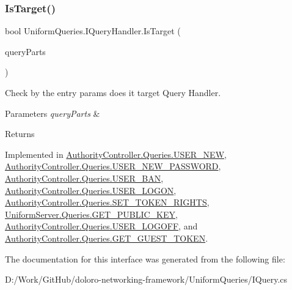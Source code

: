 \mbox{\label{interface_uniform_queries_1_1_i_query_handler_abda1ccf47ad2889fbd015955965046e7}} 
\subsubsection{\texorpdfstring{Is\+Target()}{IsTarget()}}
{\footnotesize\ttfamily bool Uniform\+Queries.\+I\+Query\+Handler.\+Is\+Target (\begin{DoxyParamCaption}\item[{\mbox{\hyperlink{struct_uniform_queries_1_1_query_part}{Query\+Part}} \mbox{[}$\,$\mbox{]}}]{query\+Parts }\end{DoxyParamCaption})}



Check by the entry params does it target Query Handler. 


\begin{DoxyParams}{Parameters}
{\em query\+Parts} & \\
\hline
\end{DoxyParams}
\begin{DoxyReturn}{Returns}

\end{DoxyReturn}


Implemented in \mbox{\hyperlink{class_authority_controller_1_1_queries_1_1_u_s_e_r___n_e_w_a6e26596b5a5ecc3d07591766b5d325ec}{Authority\+Controller.\+Queries.\+U\+S\+E\+R\+\_\+\+N\+EW}}, \mbox{\hyperlink{class_authority_controller_1_1_queries_1_1_u_s_e_r___n_e_w___p_a_s_s_w_o_r_d_a48ff6874453caf45973ad386bfe5b513}{Authority\+Controller.\+Queries.\+U\+S\+E\+R\+\_\+\+N\+E\+W\+\_\+\+P\+A\+S\+S\+W\+O\+RD}}, \mbox{\hyperlink{class_authority_controller_1_1_queries_1_1_u_s_e_r___b_a_n_a29c898b411adc3a0edbed31cf90e007b}{Authority\+Controller.\+Queries.\+U\+S\+E\+R\+\_\+\+B\+AN}}, \mbox{\hyperlink{class_authority_controller_1_1_queries_1_1_u_s_e_r___l_o_g_o_n_a53261c6c60dc1a2324a67adf19f7547a}{Authority\+Controller.\+Queries.\+U\+S\+E\+R\+\_\+\+L\+O\+G\+ON}}, \mbox{\hyperlink{class_authority_controller_1_1_queries_1_1_s_e_t___t_o_k_e_n___r_i_g_h_t_s_a605feed66d357dc93ccc825068d83c96}{Authority\+Controller.\+Queries.\+S\+E\+T\+\_\+\+T\+O\+K\+E\+N\+\_\+\+R\+I\+G\+H\+TS}}, \mbox{\hyperlink{class_uniform_server_1_1_queries_1_1_g_e_t___p_u_b_l_i_c___k_e_y_ae27d462fe9ccbbf22ac03c9ead9cbe8f}{Uniform\+Server.\+Queries.\+G\+E\+T\+\_\+\+P\+U\+B\+L\+I\+C\+\_\+\+K\+EY}}, \mbox{\hyperlink{class_authority_controller_1_1_queries_1_1_u_s_e_r___l_o_g_o_f_f_afbfa78117d68ab2bd2728c78d31c1c58}{Authority\+Controller.\+Queries.\+U\+S\+E\+R\+\_\+\+L\+O\+G\+O\+FF}}, and \mbox{\hyperlink{class_authority_controller_1_1_queries_1_1_g_e_t___g_u_e_s_t___t_o_k_e_n_a5606c5797e0a684a6bfbbd851f186268}{Authority\+Controller.\+Queries.\+G\+E\+T\+\_\+\+G\+U\+E\+S\+T\+\_\+\+T\+O\+K\+EN}}.



The documentation for this interface was generated from the following file\+:\begin{DoxyCompactItemize}
\item 
D\+:/\+Work/\+Git\+Hub/doloro-\/networking-\/framework/\+Uniform\+Queries/I\+Query.\+cs\end{DoxyCompactItemize}
